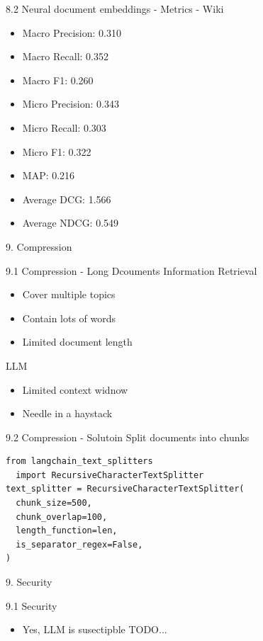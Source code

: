 \documentclass{beamer}
\begin{document}
\begin{frame}{8.2 Neural document embeddings - Metrics - Wiki}
  \begin{itemize}
    \item Macro Precision: 0.310
    \item Macro Recall: 0.352
    \item Macro F1: 0.260
    \item Micro Precision: 0.343
    \item Micro Recall: 0.303
    \item Micro F1: 0.322
    \item MAP: 0.216
    \item Average DCG: 1.566
    \item Average NDCG: 0.549
  \end{itemize}
\end{frame}

\begin{frame}{9. Compression}
\end{frame}

\begin{frame}{9.1 Compression - Long Dcouments}
  Information Retrieval
  \begin{itemize}
    \item Cover multiple topics
    \item Contain lots of words
    \item Limited document length
  \end{itemize}
  LLM
  \begin{itemize}
    \item Limited context widnow
    \item Needle in a haystack
  \end{itemize}
\end{frame}

\begin{frame}[fragile]{9.2 Compression - Solutoin}
  Split documents into chunks
  \begin{verbatim}
from langchain_text_splitters
  import RecursiveCharacterTextSplitter
text_splitter = RecursiveCharacterTextSplitter(
  chunk_size=500,
  chunk_overlap=100,
  length_function=len,
  is_separator_regex=False,
)
\end{verbatim}
\end{frame}

\begin{frame}{9. Security}
\end{frame}

\begin{frame}{9.1 Security}
  \begin{itemize}
    \item Yes, LLM is susectipble TODO...
  \end{itemize}
\end{frame}
\end{document}
